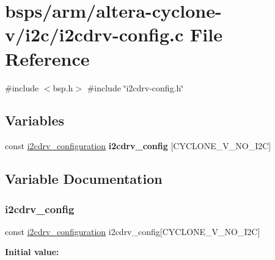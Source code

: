 \hypertarget{i2cdrv-config_8c}{}\section{bsps/arm/altera-\/cyclone-\/v/i2c/i2cdrv-\/config.c File Reference}
\label{i2cdrv-config_8c}
{\ttfamily \#include $<$bsp.\+h$>$}\newline
{\ttfamily \#include \char`\"{}i2cdrv-\/config.\+h\char`\"{}}\newline
\subsection*{Variables}
\begin{DoxyCompactItemize}
\item 
const \mbox{\hyperlink{structi2cdrv__configuration}{i2cdrv\+\_\+configuration}} {\bfseries i2cdrv\+\_\+config} \mbox{[}C\+Y\+C\+L\+O\+N\+E\+\_\+\+V\+\_\+\+N\+O\+\_\+\+I2C\mbox{]}
\end{DoxyCompactItemize}


\subsection{Variable Documentation}
\mbox{\label{i2cdrv-config_8c_afa2ddba4f22403e0ef61bcae0cf655cf}} 
\subsubsection{\texorpdfstring{i2cdrv\_config}{i2cdrv\_config}}
{\footnotesize\ttfamily const \mbox{\hyperlink{structi2cdrv__configuration}{i2cdrv\+\_\+configuration}} i2cdrv\+\_\+config\mbox{[}C\+Y\+C\+L\+O\+N\+E\+\_\+\+V\+\_\+\+N\+O\+\_\+\+I2C\mbox{]}}

{\bfseries Initial value\+:}
\begin{DoxyCode}{0}
\DoxyCodeLine{= \{}
\DoxyCodeLine{  \{}
\DoxyCodeLine{  \}}
\DoxyCodeLine{\}}

\end{DoxyCode}

